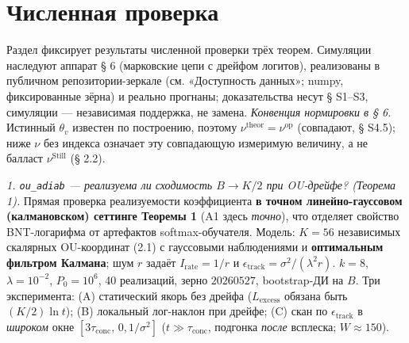 \documentclass[12pt]{iopart}
\begin{document}
\section{Численная проверка}\label{ux447ux438ux441ux43bux435ux43dux43dux430ux44f-ux43fux440ux43eux432ux435ux440ux43aux430}



Раздел фиксирует результаты численной проверки трёх теорем. Симуляции наследуют аппарат § 6 \cite{Andriishin2026b} (марковские цепи с дрейфом логитов), реализованы в публичном репозитории-зеркале (см. «Доступность данных»; numpy, фиксированные зёрна) и реально прогнаны; доказательства несут § S1--S3, симуляции --- независимая поддержка, не замена. \emph{Конвенция нормировки в § 6.} Истинный \(\theta_v\) известен по построению, поэтому \(\nu^{\text{theor}} = \nu^{\text{op}}\) (совпадают, § S4.5); ниже \(\nu\) без индекса означает эту совпадающую измеримую величину, а не балласт \(\nu^{\text{Still}}\) (§ 2.2).



\emph{1. \texttt{ou\_adiab} --- реализуема ли сходимость \(B \to K/2\) при OU-дрейфе? (Теорема 1).} Прямая проверка реализуемости коэффициента \textbf{в точном линейно-гауссовом (калмановском) сеттинге Теоремы 1} (A1 здесь \emph{точно}), что отделяет свойство BNT-логарифма от артефактов softmax-обучателя. Модель: \(K = 56\) независимых скалярных OU-координат (2.1) с гауссовыми наблюдениями и \textbf{оптимальным фильтром Калмана}; шум \(r\) задаёт \(I_{\text{rate}} = 1/r\) и \(\epsilon_{\text{track}} = \sigma^2/(\lambda^2 r)\). \(k = 8\), \(\lambda = 10^{-2}\), \(P_0 = 10^6\), 40 реализаций, зерно \(20260527\), bootstrap-ДИ на \(B\). Три эксперимента: (A) статический якорь без дрейфа (\(L_{\text{excess}}\) обязана быть \((K/2)\ln t\)); (B) локальный лог-наклон при дрейфе; (C) скан по \(\epsilon_{\text{track}}\) в \emph{широком} окне \([3\tau_{\text{conc}},\,0{,}1/\sigma^2]\) (\(t \gg \tau_{\text{conc}}\), подгонка \emph{после} всплеска; \(W \approx 150\)).
\end{document}
